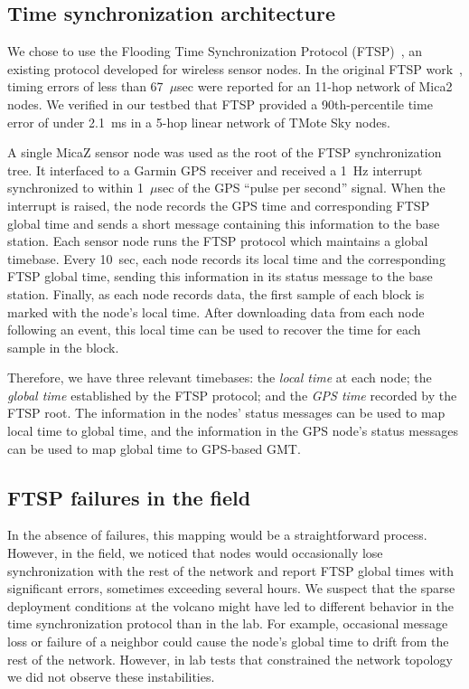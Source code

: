 \subsection{Time synchronization architecture}

We chose to use the Flooding Time Synchronization Protocol
(FTSP)~\cite{ftsp}, an existing protocol developed for
wireless sensor nodes.  In the original FTSP work~\cite{ftsp}, timing errors
of less than 67~$\mu$sec were reported for an 11-hop network of Mica2 nodes.
We verified in our testbed that FTSP provided a 90th-percentile time
error of under 2.1~ms in a 5-hop linear network of TMote Sky nodes.

A single MicaZ sensor node was used as the root of the FTSP synchronization
tree. It interfaced to a Garmin GPS receiver and received a 1~Hz interrupt
synchronized to within 1~$\mu$sec of the GPS ``pulse per second'' signal.
When the interrupt is raised, the node records the GPS time and corresponding
FTSP global time and sends a short message containing this information to the
base station.  Each sensor node runs the FTSP protocol which maintains a
global timebase. Every 10~sec, each node records its local time and the
corresponding FTSP global time, sending this information in its status
message to the base station. Finally, as each node records data, the first
sample of each block is marked with the node's local time. After downloading
data from each node following an event, this local time can be used to
recover the time for each sample in the block.

Therefore, we have three relevant timebases: the {\em local time} at each
node; the {\em global time} established by the FTSP protocol; and the
{\em GPS time} recorded by the FTSP root. The information in the nodes'
status messages can be used to map local time to global time, and the
information in the GPS node's status messages can be used to map global time
to GPS-based GMT.

\subsection{FTSP failures in the field}
\label{timing-deploymentfailures}

In the absence of failures, this mapping would be a straightforward process.
However, in the field, we noticed that nodes would occasionally lose
synchronization with the rest of the network and report FTSP global times
with significant errors, sometimes exceeding several hours. We suspect that
the sparse deployment conditions at the volcano might have led to different
behavior in the time synchronization protocol than in the lab. For
example, occasional message loss or failure of a neighbor could cause the 
node's global time to drift from the rest of the network.  
However, in lab tests that constrained the network topology we 
did not observe these instabilities.

